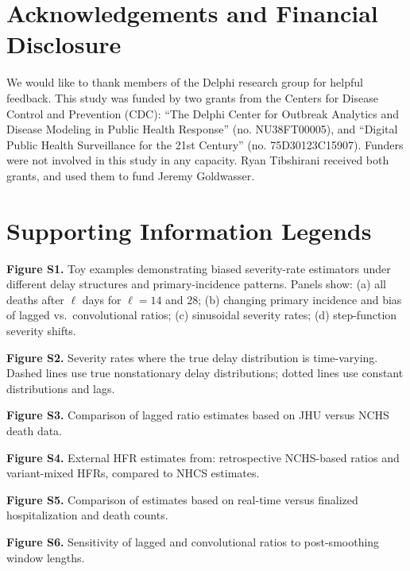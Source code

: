 \documentclass{article}
\begin{document}

\section*{Acknowledgements and Financial Disclosure}

We would like to thank members of the Delphi research group for helpful
feedback. 
This study was funded by two grants from the Centers for Disease Control and Prevention (CDC): ``The Delphi Center for Outbreak Analytics and Disease Modeling in Public Health Response'' (no. NU38FT00005), and ``Digital Public Health Surveillance for the 21st Century'' (no. 75D30123C15907). Funders were not involved in this study in any capacity. Ryan Tibshirani received both grants, and used them to fund Jeremy Goldwasser. 

% 


\section*{Supporting Information Legends}

\noindent \textbf{Figure S1.} Toy examples demonstrating biased severity-rate estimators under different delay structures and primary-incidence patterns. Panels show: (a) all deaths after $\ell$ days for $\ell=14$ and 28; (b) changing primary incidence and bias of lagged vs.\ convolutional ratios; (c) sinusoidal severity rates; (d) step-function severity shifts.

\noindent \textbf{Figure S2.} Severity rates where the true delay distribution is time-varying. Dashed lines use true nonstationary delay distributions; dotted lines use constant distributions and lags.

\noindent \textbf{Figure S3.} Comparison of lagged ratio estimates based on JHU versus NCHS death data.

\noindent \textbf{Figure S4.} External HFR estimates from: retrospective NCHS-based ratios and variant-mixed HFRs, compared to NHCS estimates.

\noindent \textbf{Figure S5.} Comparison of estimates based on real-time versus finalized hospitalization and death counts.

\noindent \textbf{Figure S6.} Sensitivity of lagged and convolutional ratios to post-smoothing window lengths.
\end{document}
